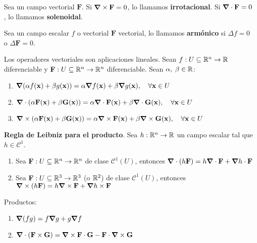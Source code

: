 \begin{definition}
    Sea un campo vectorial $\mathbf{F}$. Si $\grad\times\mathbf{F}=0$, lo llamamos \textbf{irrotacional}. Si $\grad\cdot\mathbf{F}=0$, lo llamamos \textbf{solenoidal}.
\end{definition}
\begin{definition}
    Sea un campo escalar $f$ o vectorial $\mathbf{F}$ vectorial, lo llamamos \textbf{arm\'onico} si $\Delta f=0$ o $\Delta \mathbf{F}=0$.
\end{definition}
\begin{propertie}
    Los operadores vectoriales son aplicaciones lineales. Sean $f:U\subseteq\mathbb{R}^n\to\mathbb{R}$ diferenciable y $\mathbf{F}:U\subseteq\mathbb{R}^n\to\mathbb{R}^n$ diferenciable. Sean $\alpha,\;\beta\in\mathbb{R}$:
    \begin{enumerate}
        \item \(\grad(\alpha f(\mathbf{x})+\beta g(\mathbf{x}))=\alpha\grad f(\mathbf{x})+\beta\grad g(\mathbf{x}),\quad\forall\mathbf{x}\in U\)
        \item \(\grad\cdot(\alpha \mathbf{F}(\mathbf{x})+\beta \mathbf{G}(\mathbf{x}))=\alpha\grad\cdot\mathbf{F}(\mathbf{x})+\beta\grad\cdot\mathbf{G}(\mathbf{x}),\quad\forall\mathbf{x}\in U\)
        \item \(\grad\times(\alpha \mathbf{F}(\mathbf{x})+\beta \mathbf{G}(\mathbf{x}))=\alpha\grad\times\mathbf{F}(\mathbf{x})+\beta\grad\times\mathbf{G}(\mathbf{x}),\quad\forall\mathbf{x}\in U\)
    \end{enumerate}
\end{propertie}
\begin{propertie}
    \textbf{Regla de Leibniz para el producto}. Sea $h:\mathbb{R}^n\to\mathbb{R}$ un campo escalar tal que $h\in \mathcal{C}^1$.
    \begin{enumerate}
        \item Sea $\mathbf{F}:U\subseteq\mathbb{R}^n\to\mathbb{R}^n$ de clase $\mathcal{C}^1(U)$, entonces $\grad\cdot(h\mathbf{F})=h\grad\cdot\mathbf{F}+\grad h\cdot\mathbf{F}$
        \item Sea $\mathbf{F}:U\subseteq\mathbb{R}^3\to\mathbb{R}^3$ (o $\mathbb{R}^2$) de clase $\mathcal{C}^1(U)$, entonces $\grad\times(h\mathbf{F})=h\grad\times\mathbf{F}+\grad h\times\mathbf{F}$
    \end{enumerate}
\end{propertie}
\begin{propertie}
    Productos:
    \begin{enumerate}
        \item $\grad(fg)=f\grad g+g\grad f$
        \item $\grad\cdot(\mathbf{F}\times\mathbf{G})=\grad\times\mathbf{F}\cdot\mathbf{G}-\mathbf{F}\cdot\grad\times\mathbf{G}$
    \end{enumerate}
\end{propertie}